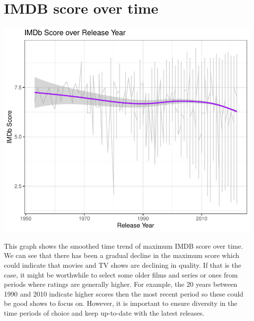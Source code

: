 \documentclass[11pt,preprint, authoryear]{elsarticle}
\numberwithin{equation}{section}
\numberwithin{figure}{section}
\numberwithin{table}{section}
\begin{document}
\hypertarget{imdb-score-over-time}{%
\section{IMDB score over time}\label{imdb-score-over-time}}

\includegraphics{Question-4_files/figure-latex/unnamed-chunk-4-1.pdf}

This graph shows the smoothed time trend of maximum IMDB score over
time. We can see that there has been a gradual decline in the maximum
score which could indicate that movies and TV shows are declining in
quality. If that is the case, it might be worthwhile to select some
older films and series or ones from periods where ratings are generally
higher. For example, the 20 years between 1990 and 2010 indicate higher
scores then the most recent period so these could be good shows to focus
on. However, it is important to ensure diversity in the time periods of
choice and keep up-to-date with the latest releases.


\end{document}
